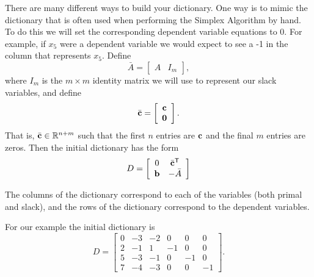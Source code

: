 There are many different ways to build your dictionary.
One way is to mimic the dictionary that is often used when performing the Simplex Algorithm by hand. To do this we will set the corresponding dependent variable equations to 0. For example, if $x_5$ were a dependent variable we would expect to see a -1 in the column that represents $x_5$.
Define \[\bar{A} = \left[\begin{array}{cc} A & I_m \end{array}\right],\]
where $I_m$ is the $m \times m$ identity matrix we will use to represent our slack variables, and define
\[\bar{\mathbf{c}} = \left[\begin{array}{c}\mathbf{c}\\ \mathbf{0}\end{array}\right].\]
That is, $\bar{\mathbf{c}} \in \mathbb{R}^{n+m}$ such that the first $n$ entries are $\mathbf{c}$ and the final $m$ entries are zeros.
Then the initial dictionary has the form
\begin{equation}
D =
\left[\begin{array}{ccc}
0  & \bar{\mathbf{c}}^{\mathsf T} \\
\mathbf{b} &  -\bar{A} 
\end{array}\right]
\label{eqn:hand_tab}
\end{equation}

The columns of the dictionary correspond to each of the variables (both primal and slack), and the rows of the dictionary correspond to the dependent variables.

For our example the initial dictionary is
\begin{equation*}
D = \begin{bmatrix}
    0 & -3 & -2 & 0 & 0 & 0\\
    2 & -1 & 1 & -1 & 0 & 0\\
    5 & -3 & -1 & 0 & -1 & 0\\
    7 & -4 & -3 & 0 & 0 & -1
    \end{bmatrix}.
\end{equation*}

